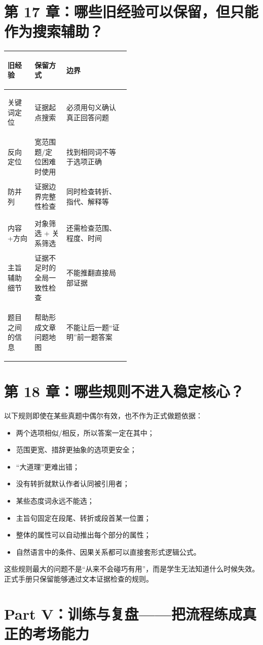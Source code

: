\documentclass[11pt,a4paper]{ctexart}
\begin{document}
\section{第 17 章：哪些旧经验可以保留，但只能作为搜索辅助？}

\begin{center}
\small
\begin{tabularx}{\linewidth}{>{\bfseries\raggedright\arraybackslash}p{0.22\linewidth} >{\raggedright\arraybackslash}p{0.26\linewidth} Y}
\toprule
旧经验 & 保留方式 & 边界 \\
\midrule
关键词定位 & 证据起点搜索 & 必须用句义确认真正回答问题 \\
反向定位 & 宽范围题/定位困难时使用 & 找到相同词不等于选项正确 \\
防并列 & 证据边界完整性检查 & 同时检查转折、指代、解释等 \\
内容+方向 & 对象筛选 + 关系筛选 & 还需检查范围、程度、时间 \\
主旨辅助细节 & 证据不足时的全局一致性检查 & 不能推翻直接局部证据 \\
题目之间的信息 & 帮助形成文章问题地图 & 不能让后一题“证明”前一题答案 \\
\bottomrule
\end{tabularx}
\end{center}

\section{第 18 章：哪些规则不进入稳定核心？}
以下规则即使在某些真题中偶尔有效，也不作为正式做题依据：
\begin{itemize}
  \item 两个选项相似/相反，所以答案一定在其中；
  \item 范围更宽、措辞更抽象的选项更安全；
  \item “大道理”更难出错；
  \item 没有转折就默认作者认同被引用者；
  \item 某些态度词永远不能选；
  \item 主旨句固定在段尾、转折或段首某一位置；
  \item 整体的属性可以自动推出每个部分的属性；
  \item 自然语言中的条件、因果关系都可以直接套形式逻辑公式。
\end{itemize}
这些规则最大的问题不是“从来不会碰巧有用”，而是学生无法知道什么时候失效。正式手册只保留能够通过文本证据检查的规则。

\section{Part V：训练与复盘——把流程练成真正的考场能力}
\end{document}
